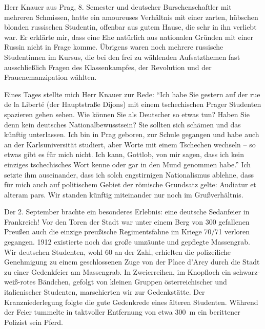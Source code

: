 Herr Knauer aus Prag, 8. Semester und deutscher Burschenschaftler mit mehreren Schmissen, hatte ein amoureuses Verhältnis mit einer zarten, hübschen blonden russischen Studentin, offenbar aus gutem Hause, die sehr in ihn verliebt war. Er erklärte mir, dass eine Ehe natürlich aus nationalen Gründen mit einer Russin nicht in Frage komme. Übrigens waren noch mehrere russische Studentinnen im Kursus, die bei den frei zu wählenden Aufsatzthemen fast ausschließlich Fragen des Klassenkampfes, der Revolution und der Frauenemanzipation wählten.

Eines Tages stellte mich Herr Knauer zur Rede: \enquote{Ich habe Sie gestern auf der rue de la Liberté (der Hauptstraße Dijons) mit einem tschechischen Prager Studenten spazieren gehen sehen. Wie können Sie als Deutscher so etwas tun? Haben Sie denn kein deutsches Nationalbewusstsein? Sie sollten sich schämen und das künftig unterlassen. Ich bin in Prag geboren, zur Schule gegangen und habe auch an der Karlsuniversität studiert, aber Worte mit einem Tschechen wechseln -- so etwas gibt es für mich nicht. Ich kann, Gottlob, von mir sagen, dass ich kein einziges tschechisches Wort kenne oder gar in den Mund genommen habe.} Ich setzte ihm auseinander, dass ich solch engstirnigen Nationalismus ablehne, dass für mich auch auf politischem Gebiet der römische Grundsatz gelte: Audiatur et alteram pars. Wir standen künftig miteinander nur noch im Grußverhältnis.

Der 2. September brachte ein besonderes Erlebnis: eine deutsche Sedanfeier in Frankreich! Vor den Toren der Stadt war unter einem Berg von 300 gefallenen Preußen auch die einzige preußische Regimentsfahne im Kriege 70/71 verloren gegangen. 1912 existierte noch das große umzäunte und gepflegte Massengrab. Wir deutschen Studenten, wohl 60 an der Zahl, erhielten die polizeiliche Genehmigung zu einem geschlossenen Zuge von der Place d'Arcy durch die Stadt zu einer Gedenkfeier am Massengrab. In Zweierreihen, im Knopfloch ein schwarz-weiß-rotes Bändchen, gefolgt von kleinen Gruppen österreichischer und italienischer Studenten, marschierten wir zur Gedenkstätte. Der Kranzniederlegung folgte die gute Gedenkrede eines älteren Studenten. Während der Feier tummelte in taktvoller Entfernung von etwa 300~m ein berittener Polizist sein Pferd.

